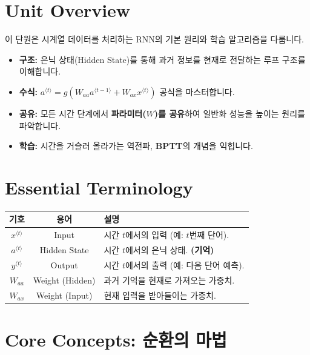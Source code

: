 \documentclass[11pt,a4paper]{book}
\theoremstyle{definition}
\begin{document}
\section{Unit Overview}
\begin{summarybox}[title={핵심 목표}]
이 단원은 시계열 데이터를 처리하는 RNN의 기본 원리와 학습 알고리즘을 다룹니다.
\begin{itemize}
    \item \textbf{구조:} 은닉 상태(Hidden State)를 통해 과거 정보를 현재로 전달하는 루프 구조를 이해합니다.
    \item \textbf{수식:} $a^{\langle t \rangle} = g(W_{aa}a^{\langle t-1 \rangle} + W_{ax}x^{\langle t \rangle})$ 공식을 마스터합니다.
    \item \textbf{공유:} 모든 시간 단계에서 \textbf{파라미터($W$)를 공유}하여 일반화 성능을 높이는 원리를 파악합니다.
    \item \textbf{학습:} 시간을 거슬러 올라가는 역전파, \textbf{BPTT}의 개념을 익힙니다.
\end{itemize}
\end{summarybox}

\section{Essential Terminology}
\begin{center}
\begin{tabular}{|c|c|l|}
\hline
\textbf{기호} & \textbf{용어} & \textbf{설명} \\ \hline
$x^{\langle t \rangle}$ & Input & 시간 $t$에서의 입력 (예: $t$번째 단어). \\ \hline
$a^{\langle t \rangle}$ & Hidden State & 시간 $t$에서의 은닉 상태. \textbf{(기억)} \\ \hline
$y^{\langle t \rangle}$ & Output & 시간 $t$에서의 출력 (예: 다음 단어 예측). \\ \hline
$W_{aa}$ & Weight (Hidden) & 과거 기억을 현재로 가져오는 가중치. \\ \hline
$W_{ax}$ & Weight (Input) & 현재 입력을 받아들이는 가중치. \\ \hline
\end{tabular}
\end{center}

\section{Core Concepts: 순환의 마법}
\end{document}
